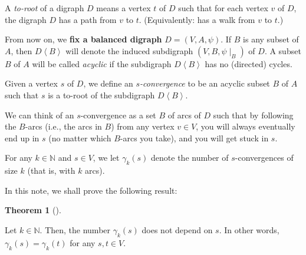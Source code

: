\documentclass[numbers=enddot,12pt,final,onecolumn,notitlepage]{scrartcl}%
\theoremstyle{definition}
\newtheorem{theo}{Theorem}[section]
\newenvironment{theorem}[1][]
{\begin{theo}[#1]\begin{leftbar}}
{\end{leftbar}\end{theo}}
\theoremstyle{plainsl}
\begin{document}
A \emph{to-root} of a digraph $D$ means a vertex $t$ of $D$ such that for each
vertex $v$ of $D$, the digraph $D$ has a path from $v$ to $t$. (Equivalently:
has a walk from $v$ to $t$.)

From now on, we \textbf{fix a balanced digraph }$D=\left(  V,A,\psi\right)  $.
If $B$ is any subset of $A$, then $D\left\langle B\right\rangle $ will denote
the induced subdigraph $\left(  V,B,\psi\mid_{B}\right)  $ of $D$. A subset
$B$ of $A$ will be called \emph{acyclic} if the subdigraph $D\left\langle
B\right\rangle $ has no (directed) cycles.

Given a vertex $s$ of $D$, we define an $s$\emph{-convergence} to be an
acyclic subset $B$ of $A$ such that $s$ is a to-root of the subdigraph
$D\left\langle B\right\rangle $.

We can think of an $s$-convergence as a set $B$ of arcs of $D$ such that by
following the $B$-arcs (i.e., the arcs in $B$) from any vertex $v\in V$, you
will always eventually end up in $s$ (no matter which $B$-arcs you take), and
you will get stuck in $s$.

For any $k\in\mathbb{N}$ and $s\in V$, we let $\gamma_{k}\left(  s\right)  $
denote the number of $s$-convergences of size $k$ (that is, with $k$ arcs).

In this note, we shall prove the following result:

\begin{theorem}
\label{thm.balgamma}Let $k\in\mathbb{N}$. Then, the number $\gamma_{k}\left(
s\right)  $ does not depend on $s$. In other words, $\gamma_{k}\left(
s\right)  =\gamma_{k}\left(  t\right)  $ for any $s,t\in V$.
\end{theorem}
\end{document}
